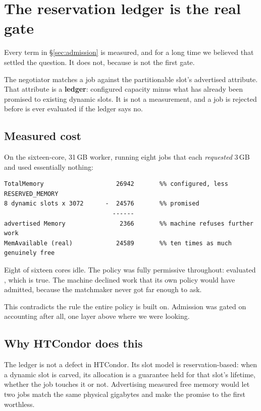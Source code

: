 \section{The reservation ledger is the real gate}
\label{sec:ledger}

Every term in \S\ref{sec:admission} is measured, and for a long time we believed
that settled the question. It does not, because  is not the first gate.

The negotiator matches a job against the partitionable slot's advertised
 attribute. That attribute is a \textbf{ledger}: configured capacity
minus what has already been promised to existing dynamic slots. It is not a
measurement, and a job is rejected before  is ever evaluated if the
ledger says no.

\subsection{Measured cost}

On the sixteen-core, 31\,GB worker, running eight jobs that each \emph{requested}
3\,GB and used essentially nothing:

\begin{lstlisting}[style=term]
TotalMemory                    26942       %% configured, less RESERVED_MEMORY
8 dynamic slots x 3072      -  24576       %% promised
                              ------
advertised Memory               2366       %% machine refuses further work
MemAvailable (real)            24589       %% ten times as much genuinely free
\end{lstlisting}

Eight of sixteen cores idle. The policy was fully permissive throughout:
 evaluated , which is true. The machine
declined work that its own policy would have admitted, because the matchmaker
never got far enough to ask.

\begin{trap}
This contradicts the rule the entire policy is built on. Admission was gated on
accounting after all, one layer above where we were looking.
\end{trap}

\subsection{Why HTCondor does this}

The ledger is not a defect in HTCondor. Its slot model is reservation-based:
when a dynamic slot is carved, its allocation is a guarantee held for that
slot's lifetime, whether the job touches it or not. Advertising measured free
memory would let two jobs match the same physical gigabytes and make the promise
to the first worthless.

